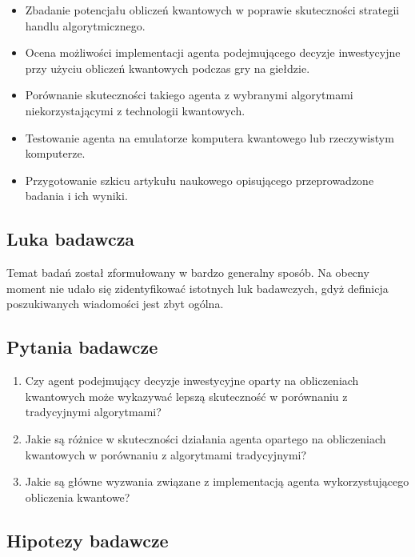 \documentclass[polish,envcountsect,10pt]{article}
\begin{document}
\begin{itemize}
    \item Zbadanie potencjału obliczeń kwantowych w poprawie skuteczności strategii handlu algorytmicznego.
    \item Ocena możliwości implementacji agenta podejmującego decyzje inwestycyjne przy użyciu obliczeń kwantowych podczas gry na giełdzie.
    \item Porównanie skuteczności takiego agenta z wybranymi algorytmami niekorzystającymi z technologii kwantowych.
    \item Testowanie agenta na emulatorze komputera kwantowego lub rzeczywistym komputerze.
    \item Przygotowanie szkicu artykułu naukowego opisującego przeprowadzone badania i ich wyniki.
\end{itemize}

\subsection{Luka badawcza}

Temat badań został zformułowany w bardzo generalny sposób. Na obecny moment nie udało się zidentyfikować istotnych luk badawczych, gdyż definicja poszukiwanych wiadomości jest zbyt ogólna.

\subsection{Pytania badawcze}

\begin{enumerate}
    \item Czy agent podejmujący decyzje inwestycyjne oparty na obliczeniach kwantowych może wykazywać lepszą skuteczność w porównaniu z tradycyjnymi algorytmami?
    \item Jakie są różnice w skuteczności działania agenta opartego na obliczeniach kwantowych w porównaniu z algorytmami tradycyjnymi?
    \item Jakie są główne wyzwania związane z implementacją agenta wykorzystującego obliczenia kwantowe?
\end{enumerate}

\subsection{Hipotezy badawcze}
\end{document}
